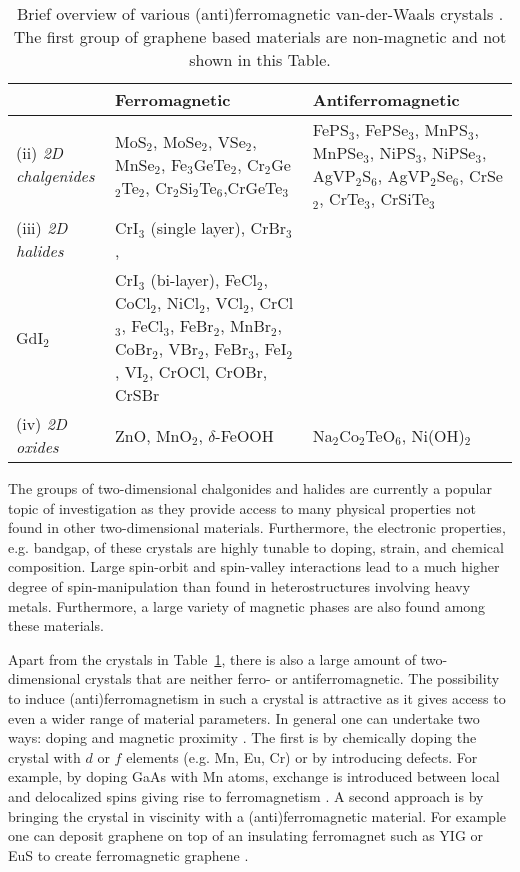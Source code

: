 \begin{table}[]
    \centering
    \begin{tabular}{l>{\raggedright}p{4cm}>{\raggedright\arraybackslash}p{4cm}}
    & \textbf{Ferromagnetic} & \textbf{Antiferromagnetic}\\\midrule
       (ii)  \textit{2D chalgenides}  & 
       MoS$_2$, MoSe$_2$, VSe$_2$, MnSe$_2$, Fe$_3$GeTe$_2$, Cr$_2$Ge$_2$Te$_2$, Cr$_2$Si$_2$Te$_6$,CrGeTe$_3$
       &
       FePS$_3$, FePSe$_3$, MnPS$_3$,  MnPSe$_3$, NiPS$_3$, NiPSe$_3$, AgVP$_2$S$_6$, AgVP$_2$Se$_6$,  CrSe$_2$, CrTe$_3$, CrSiTe$_3$
       \\\midrule
       (iii) \textit{2D halides}
       &
       CrI$_3$ (single layer), CrBr$_3$, \\ GdI$_2$
       &
       CrI$_3$ (bi-layer), FeCl$_2$, CoCl$_2$,  NiCl$_2$, VCl$_2$, CrCl$_3$, FeCl$_3$,  FeBr$_2$,   MnBr$_2$, CoBr$_2$, VBr$_2$,  FeBr$_3$, FeI$_2$, VI$_2$, CrOCl,  CrOBr, CrSBr
       \\\midrule
       (iv)  \textit{2D oxides}    & ZnO, MnO$_2$, $\delta$-FeOOH & Na$_2$Co$_2$TeO$_6$, Ni(OH)$_2$
    \end{tabular}
    \caption{Brief overview of various (anti)ferromagnetic van-der-Waals crystals \cite{sethulakshmi_magnetism_2019,tsymbal_spintronics_2019, liu_chapter_2020} . The first group of graphene based materials are non-magnetic and not shown in this Table. }
    \label{table:crystals}
\end{table}
The groups of two-dimensional chalgonides and halides are currently a popular topic of investigation as they provide access to many physical properties not found in other two-dimensional materials. Furthermore, the electronic properties, e.g. bandgap, of these crystals are highly tunable to doping, strain, and chemical composition. Large spin-orbit and spin-valley interactions lead to a much higher degree of spin-manipulation than found in heterostructures involving heavy metals. Furthermore, a large variety of magnetic phases are also found among these materials.

Apart from the crystals in Table~\ref{table:crystals}, there is also a large amount of two-dimensional crystals that are neither ferro- or antiferromagnetic. The possibility to induce (anti)ferromagnetism in such a crystal is attractive as it gives access to even a wider range of material parameters. In general one can undertake two ways: doping and magnetic proximity \cite{gonzalez-herrero_atomic-scale_2016, han_perspectives_2016, ugeda_missing_2010, han_graphene_2014}. The first is by chemically doping the crystal with $d$ or $f$ elements (e.g. Mn, Eu, Cr) or by introducing defects. For example, by doping GaAs with Mn atoms, exchange is introduced between local and delocalized spins giving rise to ferromagnetism \cite{dietl_dilute_2014}. A second approach is by bringing the crystal in viscinity with a (anti)ferromagnetic material. For example one can deposit graphene on top of an insulating ferromagnet such as YIG or EuS to create ferromagnetic graphene \cite{wang_proximity-induced_2015,leutenantsmeyer_proximity_2016}.


